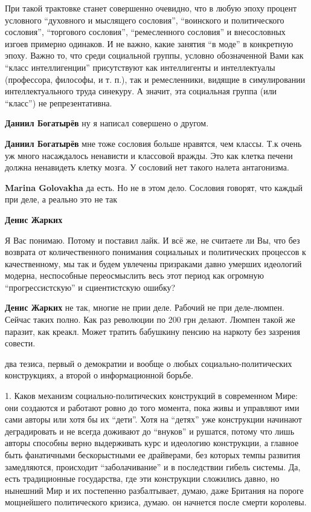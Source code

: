 \begin{itemize}
При такой трактовке станет совершенно очевидно, что в любую эпоху процент
условного \enquote{духовного и мыслящего сословия}, \enquote{воинского и политического
сословия}, \enquote{торгового сословия}, \enquote{ремесленного сословия} и внесословных изгоев
примерно одинаков. И не важно, какие занятия \enquote{в моде} в конкретную эпоху. Важно
то, что среди социальной группы, условно обозначенной Вами как \enquote{класс
интеллигенции} присутствуют как интеллигенты и интеллектуалы (профессора,
философы, и т. п.), так и ремесленники, видящие в симулировании
интеллектуального труда синекуру. А значит, эта социальная группа (или \enquote{класс})
не репрезентативна.

\begin{itemize} %
\textbf{Даниил Богатырёв} ну я написал совершено о другом.

\textbf{Даниил Богатырёв} мне тоже сословия больше нравятся, чем классы.
Т.к очень уж много насаждалось ненависти и классовой вражды. Это как клетка печени должна ненавидеть клетку мозга.
У сословий нет такого налета антагонизма.

\textbf{Marina Golovakha} да есть. Но не в этом дело. Сословия говорят, что каждый при деле, а реально это не так

\textbf{Денис Жарких} 

Я Вас понимаю. Потому и поставил лайк. И всё же, не считаете ли Вы, что без
возврата от количественного понимания социальных и политических процессов к
качественному, мы так и будем увлечены призраками давно умерших идеологий
модерна, неспособные переосмыслить весь этот период как огромную
\enquote{прогрессистскую} и сциентистскую ошибку?


\textbf{Денис Жарких} не так, многие не прии деле. Рабочий не при деле-люмпен.
Сейчас таких полно. Как раз революции по 200 грн делают.
Люмпен такой же паразит, как креакл. Может тратить бабушкину пенсию на наркоту без зазрения совести.
\end{itemize} %


два тезиса, первый о демократии и вообще о любых социально-политических
конструкциях, а второй о информационной борьбе.

1. Каков механизм социально-политических конструкций в современном Мире: они
создаются и работают ровно до того момента, пока живы и управляют ими сами
авторы или хотя бы их \enquote{дети}. Хотя на \enquote{детях} уже конструкции начинают
деградировать и не всегда доживают до \enquote{внуков} и рушатся, потому что лишь
авторы способны верно выдерживать курс и идеологию конструкции, а главное быть
фанатичными бескорыстными ее драйверами, без которых темпы развития
замедляются, происходит \enquote{заболачивание} и в последствии гибель системы. Да,
есть традиционные государства, где эти конструкции сложились давно, но нынешний
Мир и их постепенно разбалтывает, думаю, даже Британия на пороге мощнейшего
политического кризиса, думаю. он начнется после смерти королевы.


\end{itemize}
